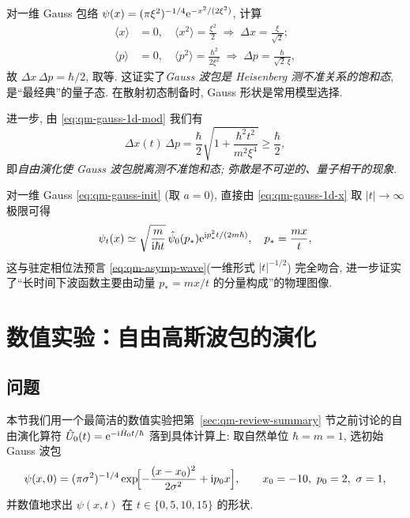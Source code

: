 \begin{example}[测不准关系的饱和]\label{ex:qm-uncertainty}
对一维 Gauss 包络 $\psi(x)=(\pi\xi^{2})^{-1/4}\mathrm{e}^{-x^{2}/(2\xi^{2})}$, 计算
\begin{align}
\langle x\rangle &=0,\quad \langle x^{2}\rangle=\frac{\xi^{2}}{2}\;\Rightarrow\; \Delta x=\frac{\xi}{\sqrt 2};\\
\langle p\rangle &=0,\quad \langle p^{2}\rangle=\frac{\hbar^{2}}{2\xi^{2}}\;\Rightarrow\; \Delta p=\frac{\hbar}{\sqrt 2\,\xi},
\end{align}
故 $\Delta x\,\Delta p=\hbar/2$, 取等. 这证实了\emph{Gauss 波包是 Heisenberg 测不准关系的饱和态}, 是``最经典''的量子态. 在散射初态制备时, Gauss 形状是常用模型选择.

进一步, 由 \eqref{eq:qm-gauss-1d-mod} 我们有
\[\Delta x(t)\,\Delta p=\frac{\hbar}{2}\sqrt{1+\frac{\hbar^{2}t^{2}}{m^{2}\xi^{4}}}\geq \frac{\hbar}{2},\]
即\emph{自由演化使 Gauss 波包脱离测不准饱和态; 弥散是不可逆的、量子相干的现象}.
\end{example}

\begin{example}\label{ex:qm-stationary}
对一维 Gauss \eqref{eq:qm-gauss-init} (取 $a=0$), 直接由 \eqref{eq:qm-gauss-1d-x} 取 $|t|\to\infty$ 极限可得
\begin{equation}
\psi_{t}(x)\simeq \sqrt{\frac{m}{\mathrm{i}\hbar t}}\,\hat\psi_{0}(p_{*})\mathrm{e}^{\mathrm{i} p_{*}^{2}t/(2m\hbar)},\quad p_{*}=\frac{mx}{t},
\end{equation}
这与驻定相位法预言 \eqref{eq:qm-asymp-wave}(一维形式 $|t|^{-1/2}$) 完全吻合, 进一步证实了``长时间下波函数主要由动量 $p_{*}=mx/t$ 的分量构成''的物理图像.
\end{example}

\section{数值实验：自由高斯波包的演化}\label{sec:numexp-ch00}

\subsection*{问题}
本节我们用一个最简洁的数值实验把第~\ref{sec:qm-review-summary} 节之前讨论的自由演化算符 $\hat{U}_{0}(t)=\mathrm{e}^{-\mathrm{i}\hat{H}_{0}t/\hbar}$ 落到具体计算上: 取自然单位 $\hbar=m=1$, 选初始 Gauss 波包
\begin{equation*}
\psi(x,0)=(\pi\sigma^{2})^{-1/4}\exp\!\Bigl[-\frac{(x-x_{0})^{2}}{2\sigma^{2}}+\mathrm{i} p_{0}x\Bigr],\qquad x_{0}=-10,\ p_{0}=2,\ \sigma=1,
\end{equation*}
并数值地求出 $\psi(x,t)$ 在 $t\in\{0,5,10,15\}$ 的形状.

